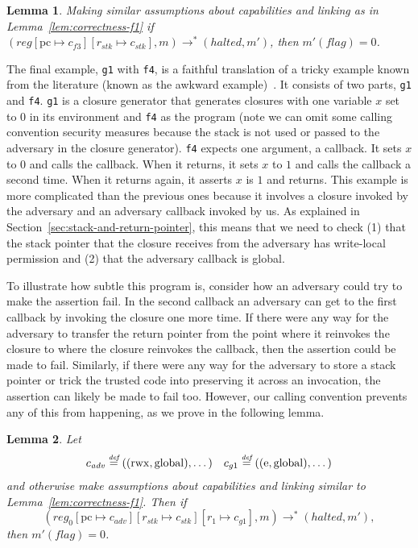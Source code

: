 \documentclass[compsoc,conference,letterpaper,fleqn]{IEEEtran}
\newtheorem{lemma}{Lemma}
\newcommand{\update}[2]{[#1 \mapsto #2]}
\newcommand{\defeq}{\stackrel{\textit{\tiny{def}}}{=}}
\newcommand{\var}[1]{\mathit{#1}}
\newcommand{\pcreg}{\mathrm{pc}}
\newcommand{\reg}{\var{reg}}
\newcommand{\adv}{\var{adv}}
\newcommand{\stk}{\var{stk}}
\newcommand{\flag}{\var{flag}}
\newcommand{\halted}{\mathit{halted}}
\newcommand{\plainperm}[1]{\mathrm{#1}}
\newcommand{\entry}{\plainperm{e}}
\newcommand{\rwx}{\plainperm{rwx}}
\newcommand{\glob}{\plainperm{global}}
\newcommand{\step}[1][]{\rightarrow_{#1}}
\begin{document}
\begin{lemma}
  \label{lem:correctness-f3}
  Making similar assumptions about capabilities and linking as in
  Lemma~\ref{lem:correctness-f1}
  if $(\reg\update{\pcreg}{c_{f3}}\update{r_\stk}{c_\stk},m) \step^*
  (\halted,m')$, then $m'(\flag) = 0$.
\end{lemma}

The final example, \texttt{\footnotesize{g1}} with \texttt{\footnotesize{f4}},
is a faithful translation of a tricky example  known from the
literature (known as the awkward example)~\citep{pitts_operational_1998,Dreyer:jfp12}. It consists of two
parts, \texttt{\footnotesize{g1}} and \texttt{\footnotesize{f4}}.
\texttt{\footnotesize{g1}} is a closure generator that generates closures with
one variable $x$ set to $0$ in its environment and \texttt{\footnotesize{f4}} as
the program (note we can omit some calling convention security measures
because the stack is not used or passed to the adversary in the closure
generator). \texttt{\footnotesize{f4}} expects one argument, a callback. It sets
$x$ to $0$ and calls the callback. When it returns, it sets $x$ to $1$ and calls
the callback a second time. When it returns again, it asserts $x$ is $1$
and returns. This example is more complicated than the previous ones because it
involves a closure invoked by the adversary and an adversary callback invoked by
us. As explained in Section~\ref{sec:stack-and-return-pointer}, this means that we
need to check (1) that the stack pointer that the closure receives from the
adversary has write-local permission and (2) that the adversary callback is global.

To illustrate how subtle this program is, consider how an adversary could try to
make the assertion fail. In the second callback an adversary can get to the
first callback by invoking the closure one more time. If there were any way for
the adversary to transfer the return pointer from the point where it reinvokes
the closure to where the closure reinvokes the callback, then the assertion
could be made to fail. Similarly, if there were any way for the adversary to
store a stack pointer or trick the trusted code into preserving it across an
invocation, the assertion can likely be made to fail too. However, our calling
convention prevents any of this from happening, as we prove in the following
lemma.

\begin{lemma}
  \label{lem:correctness-g1}
  Let
\[
    \begin{array}{r@{}lr@{}l}
    c_{\var{adv}} & \;\defeq ((\rwx,\glob),\dots) & c_{g1} & \;\defeq ((\entry,\glob),\dots)
    \end{array}
\]
  and otherwise make assumptions about capabilities and linking similar to Lemma~\ref{lem:correctness-f1}.
  Then if
  \[
  (\reg_0\update{\pcreg}{c_\adv}\update{r_\stk}{c_\stk}\update{r_1}{c_{g1}},m) \step^* (\halted,m'),
  \]
  then $m'(\flag) = 0$.
\end{lemma}
\end{document}
